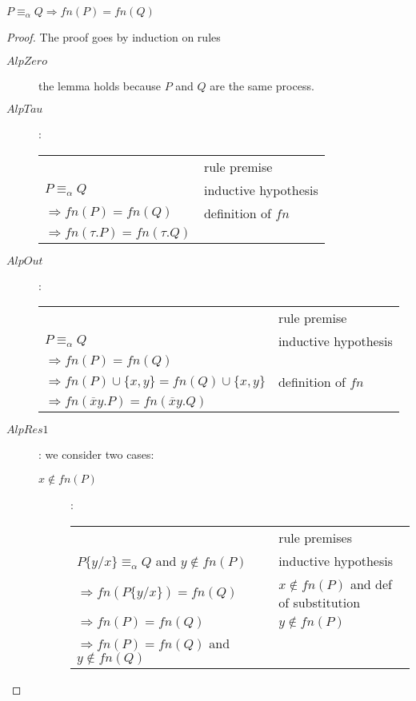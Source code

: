 \begin{lemma}\label{alphaequivalentsamefreenames}
  $P\equiv_{\alpha}Q\Rightarrow fn(P)=fn(Q)$
  \begin{proof}
    The proof goes by induction on rules 
    \begin{description}
      \item[$AlpZero$]
	the lemma holds because $P$ and $Q$ are the same process.
      \item[$AlpTau$]:
	\begin{center}
	  \begin{tabular}{ll}
	    &rule premise\\
	    $P\equiv_{\alpha}Q$&inductive hypothesis\\
	    $\Rightarrow fn(P)=fn(Q)$&definition of $fn$\\
	    $\Rightarrow fn(\tau.P)=fn(\tau.Q)$&\\
	  \end{tabular}
	\end{center}
      \item[$AlpOut$]:
	\begin{center}
	  \begin{tabular}{ll}
	    &rule premise\\
	    $P\equiv_{\alpha}Q$&inductive hypothesis\\
	    $\Rightarrow fn(P)=fn(Q)$&\\
	    $\Rightarrow fn(P)\cup \{x,y\}=fn(Q)\cup \{x,y\}$&definition of $fn$\\
	    $\Rightarrow fn(\overline{x}y.P)=fn(\overline{x}y.Q)$&\\
	  \end{tabular}
	\end{center}
      \item[$AlpRes1$]:
	we consider two cases:
	\begin{description}
	  \item[$x\notin fn(P)$]:
	    \begin{center}
	      \begin{tabular}{ll}
		&rule premises\\
		$P\{y/x\}\equiv_{\alpha}Q$ and $y\notin fn(P)$&inductive hypothesis\\
		$\Rightarrow fn(P\{y/x\})=fn(Q)$&$x\notin fn(P)$ and def of substitution\\
		$\Rightarrow fn(P)=fn(Q)$&$y\notin fn(P)$\\
		$\Rightarrow fn(P)=fn(Q)$ and $y\notin fn(Q)$&\\
	      \end{tabular}

\end{center}
\end{description}
\end{description}
\end{proof}
\end{lemma}
